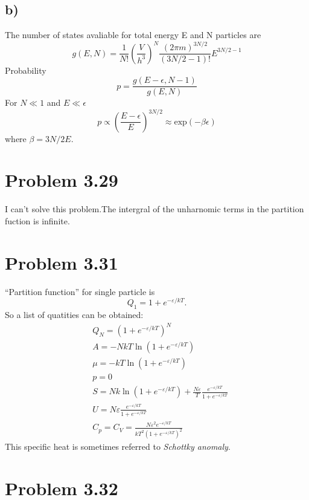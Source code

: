 \documentclass{article}
\begin{document}
\subsection*{b)}
The number of states avaliable for total energy E and N particles are
\begin{equation*}
g(E,N)=\frac{1}{N!}(\frac{V}{h^3})^N\frac{(2\pi m )^{3N/2}}{(3N/2-1)!}E^{3N/2-1}
\end{equation*}
Probability
\begin{equation*}
p=\frac{g(E-\epsilon,N-1)}{g(E,N)}
\end{equation*}
For $N\ll1$ and $E\ll\epsilon$
\begin{equation*}
p\propto\left(\frac{E-\epsilon}{E}\right)^{3N/2}\approx \mathrm{exp}(-\beta \epsilon)
\end{equation*}
where $\beta=3N/2E$.

\section*{Problem 3.29}
	I can't solve this problem.The intergral of the unharnomic terms in the partition fuction is infinite.
	
\section*{Problem 3.31}
	``Partition function'' for single particle is
	\begin{equation}
	Q_{1} = 1 + e^{-\varepsilon/kT}.
	\end{equation}
	So a list of quatities can be obtained:
	\begin{align}
	&Q_{N} = (1 + e^{-\varepsilon/kT})^{N} \\
	&A = - NkT \ln (1 + e^{-\varepsilon/kT}) \\
	&\mu = - kT \ln (1 + e^{-\varepsilon/kT}) \\
	&p=0 \\
	&S = Nk \ln (1 + e^{-\varepsilon/kT}) + \frac{N \varepsilon}{T} \frac{e^{-\varepsilon/kT}}{1+e^{-\varepsilon/kT}} \\
	&U =  N \varepsilon \frac{e^{-\varepsilon/kT}}{1+e^{-\varepsilon/kT}} \\
	&C_{p} = C_{V} =  \frac{N \varepsilon^{2} e^{-\varepsilon/kT}}{kT^{2} (1+e^{-\varepsilon/kT})^{2}}
	\end{align}
	This specific heat is sometimes referred to \emph{Schottky anomaly}.

\section*{Problem 3.32}
\end{document}
